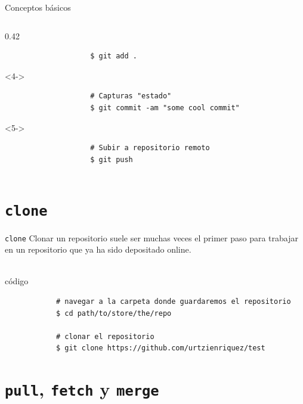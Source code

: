 \documentclass{beamer}
\begin{document}
\begin{frame}[fragile]{Conceptos básicos}
\begin{columns}
\begin{column}{0.42\textwidth}
\begin{exampleblock}{}
\begin{verbatim}
                    $ git add .
                \end{verbatim}
            \end{exampleblock}
            \begin{exampleblock}{}<4->
                \scriptsize
                \begin{verbatim}
                    # Capturas "estado"
                    $ git commit -am "some cool commit"
                \end{verbatim}
            \end{exampleblock}
            \begin{exampleblock}{}<5->
                \scriptsize
                \begin{verbatim}
                    # Subir a repositorio remoto
                    $ git push
                \end{verbatim}
            \end{exampleblock}
        \end{column}
    \end{columns}
\end{frame}

\section{\texttt{clone}}

\begin{frame}[fragile]{\texttt{clone}}
    Clonar un repositorio suele ser muchas veces
    el primer paso para trabajar en un 
    repositorio que ya ha sido depositado online. \\~\\
    \begin{exampleblock}{código}
        \scriptsize
        \begin{verbatim}
            # navegar a la carpeta donde guardaremos el repositorio
            $ cd path/to/store/the/repo
                    
            # clonar el repositorio
            $ git clone https://github.com/urtzienriquez/test
        \end{verbatim}
    \end{exampleblock}
\end{frame}

\section{\texttt{pull}, \texttt{fetch} y \texttt{merge}}
\end{document}
